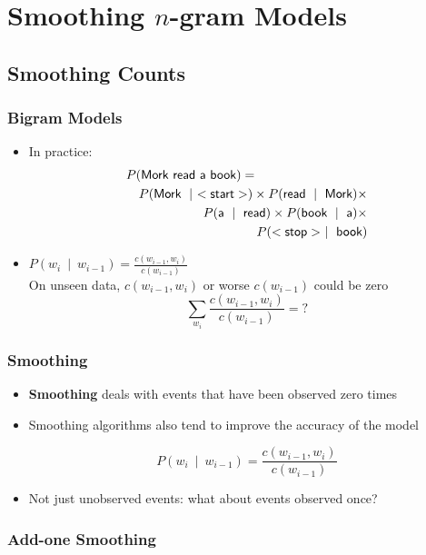 \section{Smoothing $n$-gram Models}
\frame{\tableofcontents[currentsection]}
\subsection{Smoothing Counts}

\begin{frame}
\frametitle{Bigram Models}
\begin{itemize}[<+->]
\item
In practice: 
\begin{eqnarray*}
\lefteqn{P(\textsf{Mork read a book})=}\\
&& P(\textsf{Mork}~\mid~<\textsf{start}>) \times P(\textsf{read}~\mid~\textsf{Mork}) \times \\
&& P(\textsf{a}~\mid~\textsf{read}) \times P(\textsf{book}~\mid~\textsf{a}) \times \\
&& P(<\textsf{stop}>~\mid~\textsf{book})
\end{eqnarray*}

\item $P(w_i~\mid~w_{i-1}) = \frac{ c(w_{i-1},w_i) } { c(w_{i-1}) }$ \\
 On unseen data, $c(w_{i-1},w_i)$ or worse $c(w_{i-1})$ could be zero
\[ \sum_{w_i} \frac{ c(w_{i-1},w_i) } { c(w_{i-1}) } = ? \]

\end{itemize}
\end{frame}


\begin{frame}
\frametitle{Smoothing}
\begin{itemize}[<+->]

\item {\bf Smoothing} deals with events that have been observed zero times

\item Smoothing algorithms also tend to improve the accuracy of the model

\[ P(w_i~\mid~w_{i-1}) = \frac{ c(w_{i-1},w_i) } { c(w_{i-1}) } \]

\item Not just unobserved events: what about events observed once?
\end{itemize}
\end{frame}

\subsubsection{Add-one Smoothing}

